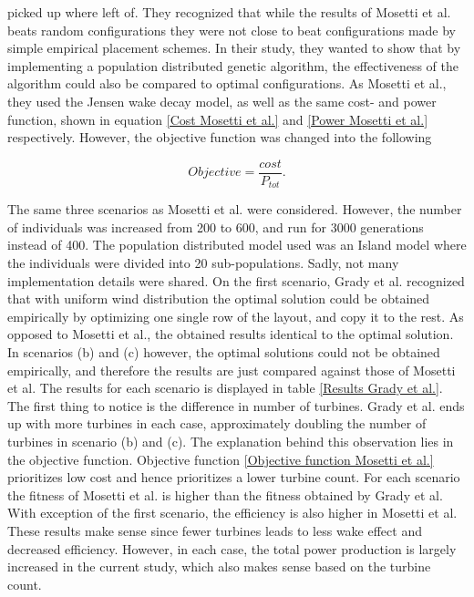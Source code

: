 \noindent \cite{Grady} picked up where \cite{Mosetti} left of. They recognized that while the results of Mosetti et al. beats random configurations they were not close to beat configurations made by simple empirical placement schemes. In their study, they wanted to show that by implementing a population distributed genetic algorithm, the effectiveness of the algorithm could also be compared to optimal configurations.	 As Mosetti et al., they used the Jensen wake decay model, as well as the same cost- and power function, shown in equation \ref{Cost Mosetti et al.} and \ref{Power Mosetti et al.} respectively. However, the objective function was changed into the following

\begin{equation}
Objective = \frac{cost}{P_{tot}}.
\label{Objective function Grady et al.}
\end{equation}


\noindent The same three scenarios as Mosetti et al. were considered. However, the number of individuals was increased from 200 to 600, and run for 3000 generations instead of 400. The population distributed model used was an Island model where the individuals were divided into 20 sub-populations. Sadly, not many implementation details were shared. On the first scenario, Grady et al. recognized that with uniform wind distribution the optimal solution could be obtained empirically by optimizing one single row of the layout, and copy it to the rest. As opposed to Mosetti et al., the obtained results identical to the optimal solution. In scenarios (b) and (c) however, the optimal solutions could not be obtained empirically, and therefore the results are just compared against those of Mosetti et al. The results for each scenario is displayed in table \ref{Results Grady et al.}. The first thing to notice is the difference in number of turbines. Grady et al. ends up with more turbines in each case, approximately doubling the number of turbines in scenario (b) and (c). The explanation behind this observation lies in the objective function. Objective function \ref{Objective function Mosetti et al.} prioritizes low cost and hence prioritizes a lower turbine count. For each scenario the fitness of Mosetti et al. is higher than the fitness obtained by Grady et al. With exception of the first scenario, the efficiency is also higher in Mosetti et al. These results make sense since fewer turbines leads to less wake effect and decreased efficiency. However, in each case, the total power production is largely increased in the current study, which also makes sense based on the turbine count. \\


